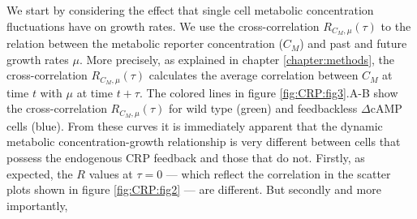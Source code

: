 %
We start by considering the effect that single cell metabolic concentration fluctuations have on growth rates.
%
We use the 
cross-correlation $R_{C_M,\mu}(\tau)$ to  the relation between the metabolic reporter concentration ($C_M$) and past and future growth rates $\mu$.
%
More precisely, as explained in chapter \ref{chapter:methods}, the cross-correlation $R_{C_M,\mu}(\tau)$ calculates the average correlation between $C_M$ at time $t$ with $\mu$ at time $t+\tau$.
%
The colored lines in figure \ref{fig:CRP:fig3}.A-B show the cross-correlation $R_{C_M,\mu}(\tau)$ for wild type (green) and feedbackless $\Delta$cAMP cells (blue).
%
%
From these curves it is immediately apparent that the dynamic metabolic concentration-growth relationship is very different between cells 
that possess the endogenous CRP feedback and those that do not.
%
Firstly, as expected, the $R$ values at $\tau=0$ --- which reflect the correlation in the scatter plots shown in figure \ref{fig:CRP:fig2} --- are different.
But secondly and more importantly, 
%
%
%


